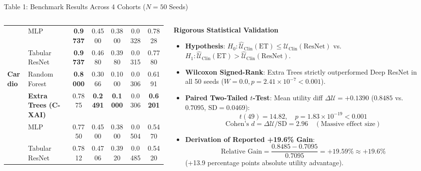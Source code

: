 \documentclass[aspectratio=169,10pt]{beamer}
\begin{document}
\begin{frame}{Table 1: Benchmark Results Across 4 Cohorts ($N = 50$ Seeds)}
\begin{columns}[t]
\begin{column}{0.53\textwidth}
\begin{table}[h]
\begin{tabular}{llccccc}
          & MLP & \textbf{0.9737} & 0.4500 & 0.3800 & 0.0328 & 0.7828 \\
          & Tabular ResNet & \textbf{0.9737} & 0.4680 & 0.3980 & 0.0315 & 0.7780 \\
          \midrule
          \multirow{4}{*}{\textbf{Cardio}} 
          & Random Forest & \textbf{0.8000} & 0.3066 & 0.1000 & 0.0306 & 0.6191 \\
          & \textbf{Extra Trees (C-XAI)} & 0.7875 & \textbf{0.2491} & \textbf{0.1000} & 0.0306 & \textbf{0.6201} \\
          & MLP & 0.7750 & 0.4500 & 0.3800 & 0.0504 & 0.5470 \\
          & Tabular ResNet & 0.7812 & 0.4706 & 0.3920 & 0.0485 & 0.5420 \\
          \bottomrule
        \end{tabular}
      \end{table}
    \end{column}
    \begin{column}{0.45\textwidth}
      \begin{exampleblock}{\textbf{Rigorous Statistical Validation}}
        \fontsize{5.8pt}{7.2pt}\selectfont
        \begin{itemize}\setlength\itemsep{1.5pt}
          \item \textbf{Hypothesis}: $H_0: \widehat{\mathcal{U}}_{\text{Clin}}(\text{ET}) \le \widehat{\mathcal{U}}_{\text{Clin}}(\text{ResNet})$ vs. $H_1: \widehat{\mathcal{U}}_{\text{Clin}}(\text{ET}) > \widehat{\mathcal{U}}_{\text{Clin}}(\text{ResNet})$.
          \item \textbf{Wilcoxon Signed-Rank}: Extra Trees strictly outperformed Deep ResNet in all 50 seeds ($W = 0.0, p = 2.41 \times 10^{-7} < 0.001$).
          \item \textbf{Paired Two-Tailed $t$-Test}:
          Mean utility diff $\Delta \mathcal{U} = +0.1390$ ($0.8485$ vs. $0.7095$, $\text{SD} = 0.0469$):
          \vspace{1pt}
          $$t(49) = 14.82, \quad p = 1.83 \times 10^{-19} < 0.001$$
          $$\text{Cohen's } d = \Delta \mathcal{U} / \text{SD} = \mathbf{2.96} \quad (\text{Massive effect size})$$
          \item \textbf{Derivation of Reported +19.6\% Gain}:
          \vspace{1pt}
          $$\text{Relative Gain} = \frac{0.8485 - 0.7095}{0.7095} = \mathbf{+19.59\% \approx +19.6\%}$$
          (+13.9 percentage points absolute utility advantage).
        \end{itemize}
      \end{exampleblock}
    \end{column}
  \end{columns}
\end{frame}
\end{document}
